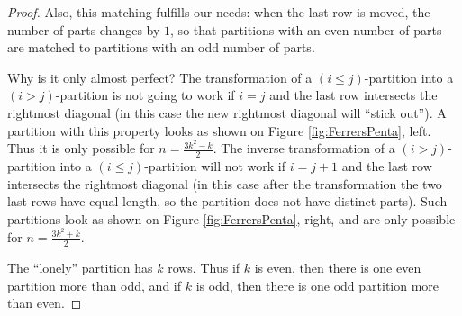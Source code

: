 \begin{proof}
Also, this matching fulfills our needs: when the last row is moved, the number of parts changes by $1$,
so that partitions with an even number of parts are matched to partitions with an odd number of parts.

Why is it only almost perfect?
The transformation of a $(i \le j)$-partition into a $(i > j)$-partition is not going to work if $i=j$ and the last row intersects the rightmost diagonal
(in this case the new rightmost diagonal will ``stick out'').
A partition with this property looks as shown on Figure \ref{fig:FerrersPenta}, left.
Thus it is only possible for $n = \frac{3k^2 - k}2$.
The inverse transformation of a $(i > j)$-partition into a $(i \le j)$-partition will not work
if $i = j+1$ and the last row intersects the rightmost diagonal
(in this case after the transformation the two last rows have equal length, so the partition does not have distinct parts).
Such partitions look as shown on Figure \ref{fig:FerrersPenta}, right, and are only possible for $n = \frac{3k^2 + k}2$.

The ``lonely'' partition has $k$ rows.
Thus if $k$ is even, then there is one even partition more than odd,
and if $k$ is odd, then there is one odd partition more than even.
\end{proof}







